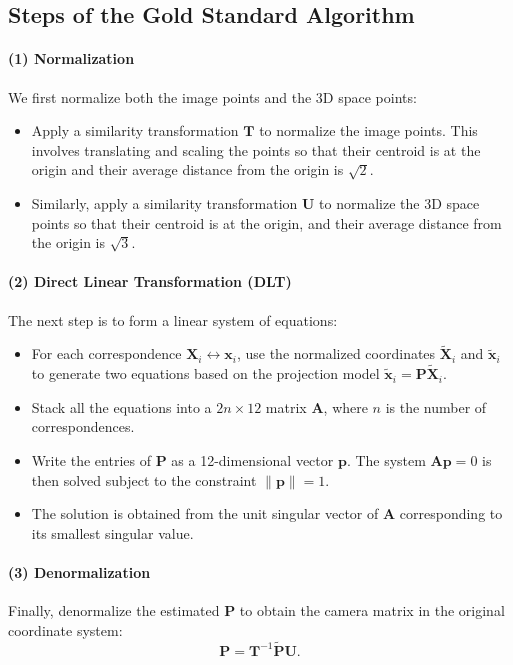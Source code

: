 \documentclass[12pt]{article}
\begin{document}
\subsection{Steps of the Gold Standard Algorithm}

\paragraph{(1) Normalization}
We first normalize both the image points and the 3D space points:
\begin{itemize}
    \item Apply a similarity transformation $ \mathbf{T} $ to normalize the image points. This involves translating and scaling the points so that their centroid is at the origin and their average distance from the origin is $\sqrt{2}$.
    \item Similarly, apply a similarity transformation $ \mathbf{U} $ to normalize the 3D space points so that their centroid is at the origin, and their average distance from the origin is $\sqrt{3}$.
\end{itemize}

\paragraph{(2) Direct Linear Transformation (DLT)}
The next step is to form a linear system of equations:
\begin{itemize}
    \item For each correspondence $ \mathbf{X}_i \leftrightarrow \mathbf{x}_i $, use the normalized coordinates $ \tilde{\mathbf{X}}_i $ and $ \tilde{\mathbf{x}}_i $ to generate two equations based on the projection model $ \tilde{\mathbf{x}}_i = \mathbf{P} \tilde{\mathbf{X}}_i $.
    \item Stack all the equations into a $ 2n \times 12 $ matrix $ \mathbf{A} $, where $ n $ is the number of correspondences.
    \item Write the entries of $ \mathbf{P} $ as a 12-dimensional vector $ \mathbf{p} $. The system $ \mathbf{A} \mathbf{p} = 0 $ is then solved subject to the constraint $ \| \mathbf{p} \| = 1 $.
    \item The solution is obtained from the unit singular vector of $ \mathbf{A} $ corresponding to its smallest singular value.
\end{itemize}

\paragraph{(3) Denormalization}
Finally, denormalize the estimated $ \mathbf{P} $ to obtain the camera matrix in the original coordinate system:
$$
\mathbf{P} = \mathbf{T}^{-1} \tilde{\mathbf{P}} \mathbf{U}.
$$
\end{document}
